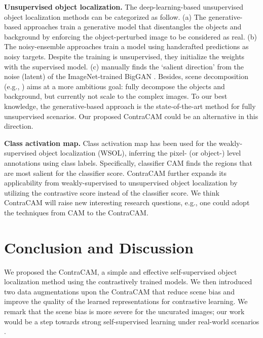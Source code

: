 \documentclass{article}
\begin{document}
\textbf{Unsupervised object localization.}
The deep-learning-based unsupervised object localization methods can be categorized as follow.
(a) The generative-based \citep{chen2019unsupervised,bielski2019emergence,arandjelovic2019object} approaches train a generative model that disentangles the objects and background by enforcing the object-perturbed image to be considered as real. (b) The noisy-ensemble \citep{nguyen2019deepusps,zhang2018deep,zhang2017supervision} approaches train a model using handcrafted predictions as noisy targets. Despite the training is unsupervised, they initialize the weights with the supervised model. (c) \citet{voynov2020big} manually finds the `salient direction' from the noise (latent) of the ImageNet-trained BigGAN \citep{brock2019large}. Besides, scene decomposition (e.g., \citep{engelcke2021genesis}) aims at a more ambitious goal: fully decompose the objects and background, but currently not scale to the complex images. To our best knowledge, the generative-based approach is the state-of-the-art method for fully unsupervised scenarios. Our proposed ContraCAM could be an alternative in this direction.

\textbf{Class activation map.}
Class activation map \citep{zhou2016learning,selvaraju2017grad} has been used for the weakly-supervised object localization (WSOL), inferring the pixel- (or object-) level annotations using class labels. Specifically, classifier CAM finds the regions that are most salient for the classifier score. ContraCAM further expands its applicability from weakly-supervised to unsupervised object localization by utilizing the contrastive score instead of the classifier score. We think ContraCAM will raise new interesting research questions, e.g., one could adopt the techniques from CAM to the ContraCAM.


\section{Conclusion and Discussion}
\label{sec:conclusion}

We proposed the ContraCAM, a simple and effective self-supervised object localization method using the contrastively trained models. We then introduced two data augmentations upon the ContraCAM that reduce scene bias and improve the quality of the learned representations for contrastive learning. We remark that the scene bias is more severe for the uncurated images; our work would be a step towards strong self-supervised learning under real-world scenarios \citep{goyal2021self,tian2021divide}.
\end{document}
